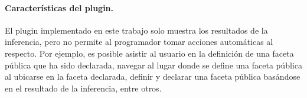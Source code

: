\begin{conclusion}
	\paragraph{Características del plugin.}El plugin implementado en este trabajo solo muestra los resultados de la inferencia, pero no permite al programador tomar acciones automáticas al respecto. Por ejemplo, es posible asistir al usuario en la definición de una faceta pública que ha sido declarada, navegar al lugar donde se define una faceta pública al ubicarse en la faceta declarada, definir y declarar una faceta pública basándose en el resultado de la inferencia, entre otros.



\end{conclusion}
